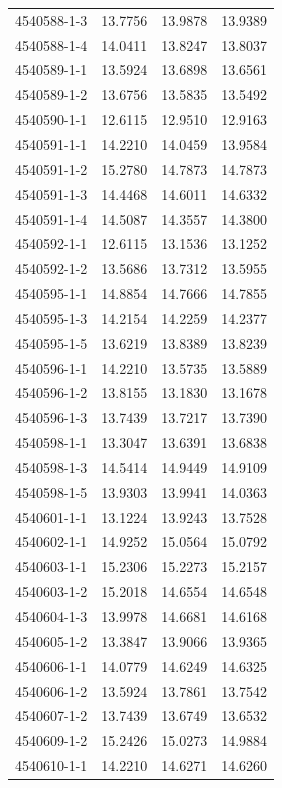 \begin{longtable}{lrrr}
4540588-1-3 & 13.7756 & 13.9878 & 13.9389 \\
4540588-1-4 & 14.0411 & 13.8247 & 13.8037 \\
4540589-1-1 & 13.5924 & 13.6898 & 13.6561 \\
4540589-1-2 & 13.6756 & 13.5835 & 13.5492 \\
4540590-1-1 & 12.6115 & 12.9510 & 12.9163 \\
4540591-1-1 & 14.2210 & 14.0459 & 13.9584 \\
4540591-1-2 & 15.2780 & 14.7873 & 14.7873 \\
4540591-1-3 & 14.4468 & 14.6011 & 14.6332 \\
4540591-1-4 & 14.5087 & 14.3557 & 14.3800 \\
4540592-1-1 & 12.6115 & 13.1536 & 13.1252 \\
4540592-1-2 & 13.5686 & 13.7312 & 13.5955 \\
4540595-1-1 & 14.8854 & 14.7666 & 14.7855 \\
4540595-1-3 & 14.2154 & 14.2259 & 14.2377 \\
4540595-1-5 & 13.6219 & 13.8389 & 13.8239 \\
4540596-1-1 & 14.2210 & 13.5735 & 13.5889 \\
4540596-1-2 & 13.8155 & 13.1830 & 13.1678 \\
4540596-1-3 & 13.7439 & 13.7217 & 13.7390 \\
4540598-1-1 & 13.3047 & 13.6391 & 13.6838 \\
4540598-1-3 & 14.5414 & 14.9449 & 14.9109 \\
4540598-1-5 & 13.9303 & 13.9941 & 14.0363 \\
4540601-1-1 & 13.1224 & 13.9243 & 13.7528 \\
4540602-1-1 & 14.9252 & 15.0564 & 15.0792 \\
4540603-1-1 & 15.2306 & 15.2273 & 15.2157 \\
4540603-1-2 & 15.2018 & 14.6554 & 14.6548 \\
4540604-1-3 & 13.9978 & 14.6681 & 14.6168 \\
4540605-1-2 & 13.3847 & 13.9066 & 13.9365 \\
4540606-1-1 & 14.0779 & 14.6249 & 14.6325 \\
4540606-1-2 & 13.5924 & 13.7861 & 13.7542 \\
4540607-1-2 & 13.7439 & 13.6749 & 13.6532 \\
4540609-1-2 & 15.2426 & 15.0273 & 14.9884 \\
4540610-1-1 & 14.2210 & 14.6271 & 14.6260 \\

\end{longtable}
